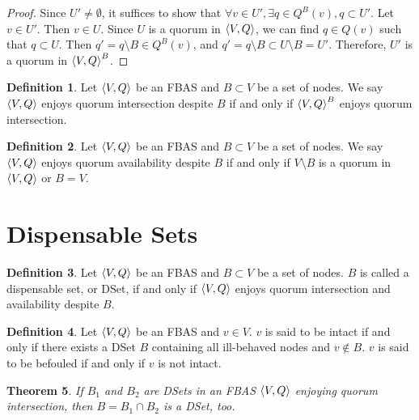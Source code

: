 \documentclass[12pt, psamsfonts]{amsart}
\newtheorem{thm}{Theorem}[section]
\theoremstyle{definition}
\newtheorem{defn}[thm]{Definition}
\theoremstyle{remark}
\numberwithin{equation}{section}
\begin{document}
\begin{proof}
    Since $U' \ne \emptyset$, it suffices to show that $\forall v \in U', \exists q \in Q^B(v), q \subset U'$.
    Let $v \in U'$.
    Then $v \in U$.
    Since $U$ is a quorum in $\ev{V, Q}$, we can find $q \in Q(v)$ such that $q \subset U$.
    Then $q' = q \setminus B \in Q^B(v)$, and $q' = q \setminus B \subset U \setminus B = U'$.
    Therefore, $U'$ is a quorum in $\ev{V, Q}^B$.
\end{proof}

\begin{defn}
    Let $\ev{V, Q}$ be an FBAS and $B \subset V$ be a set of nodes.
    We say $\ev{V, Q}$ enjoys quorum intersection despite $B$ if and only if $\ev{V, Q}^B$ enjoys quorum intersection.
\end{defn}

\begin{defn}
    Let $\ev{V, Q}$ be an FBAS and $B \subset V$ be a set of nodes.
    We say $\ev{V, Q}$ enjoys quorum availability despite $B$ if and only if $V \setminus B$ is a quorum in $\ev{V, Q}$ or $B = V$.
\end{defn}

\section{Dispensable Sets}

\begin{defn}\label{def_dset}
    Let $\ev{V, Q}$ be an FBAS and $B \subset V$ be a set of nodes.
    $B$ is called a dispensable set, or DSet, if and only if $\ev{V, Q}$ enjoys quorum intersection and availability despite $B$.
\end{defn}

\begin{defn}
    Let $\ev{V, Q}$ be an FBAS and $v \in V$.
    $v$ is said to be intact if and only if there exists a DSet $B$ containing all ill-behaved nodes and $v \notin B$.
    $v$ is said to be befouled if and only if $v$ is not intact.
\end{defn}

\begin{thm}\label{intersection_dset}
    If $B_1$ and $B_2$ are DSets in an FBAS $\ev{V, Q}$ enjoying quorum intersection, then $B = B_1 \cap B_2$ is a DSet, too.
\end{thm}
\end{document}
